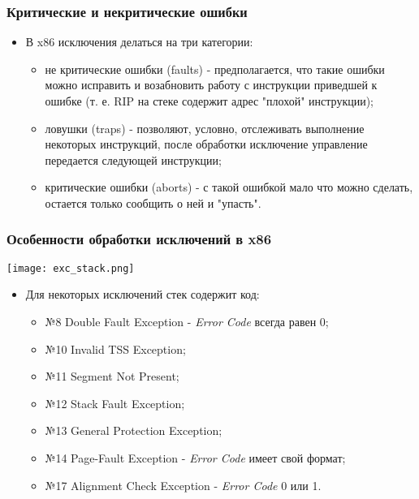 \begin{frame}
\frametitle{Критические и некритические ошибки}
\begin{itemize}
  \item В x86 исключения делаться на три категории:
  \begin{itemize}
    \item не критические ошибки (faults) - предполагается, что такие ошибки
    можно исправить и возабновить работу с инструкции приведшей к ошибке (т. е.
    RIP на стеке содержит адрес "плохой" инструкции);
    \item ловушки (traps) - позволяют, условно, отслеживать выполнение некоторых
    инструкций, после обработки исключение управление передается следующей
    инструкции;
    \item критические ошибки (aborts) - с такой ошибкой мало что можно сделать,
    остается только сообщить о ней и "упасть".
  \end{itemize}
\end{itemize}
\end{frame}

\begin{frame}
\frametitle{Особенности обработки исключений в x86}
\begin{center}
  \texttt{[image: exc\_stack.png]}
\end{center}
\begin{itemize}
  \item Для некоторых исключений стек содержит код:
  \begin{itemize}
    \item №8 Double Fault Exception - \emph{Error Code} всегда равен 0;
    \item №10 Invalid TSS Exception;
    \item №11 Segment Not Present;
    \item №12 Stack Fault Exception;
    \item №13 General Protection Exception;
    \item №14 Page-Fault Exception - \emph{Error Code} имеет свой формат;
    \item №17 Alignment Check Exception - \emph{Error Code} 0 или 1.
  \end{itemize}
\end{itemize}
\end{frame}

